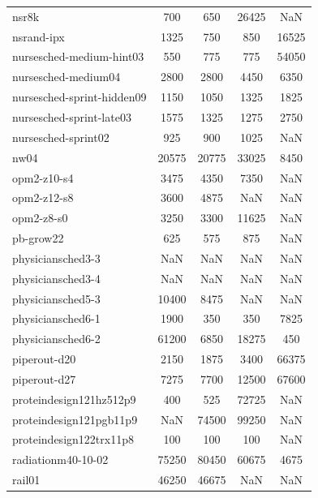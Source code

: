 \begin{longtable}{lcccc}
nsr8k                       &      700 &      650 &    26425 &   NaN \\
nsrand-ipx                  &     1325 &      750 &      850 & 16525 \\
nursesched-medium-hint03    &      550 &      775 &      775 & 54050 \\
nursesched-medium04         &     2800 &     2800 &     4450 &  6350 \\
nursesched-sprint-hidden09  &     1150 &     1050 &     1325 &  1825 \\
nursesched-sprint-late03    &     1575 &     1325 &     1275 &  2750 \\
nursesched-sprint02         &      925 &      900 &     1025 &   NaN \\
nw04                        &    20575 &    20775 &    33025 &  8450 \\
opm2-z10-s4                 &     3475 &     4350 &     7350 &   NaN \\
opm2-z12-s8                 &     3600 &     4875 &      NaN &   NaN \\
opm2-z8-s0                  &     3250 &     3300 &    11625 &   NaN \\
pb-grow22                   &      625 &      575 &      875 &   NaN \\
physiciansched3-3           &      NaN &      NaN &      NaN &   NaN \\
physiciansched3-4           &      NaN &      NaN &      NaN &   NaN \\
physiciansched5-3           &    10400 &     8475 &      NaN &   NaN \\
physiciansched6-1           &     1900 &      350 &      350 &  7825 \\
physiciansched6-2           &    61200 &     6850 &    18275 &   450 \\
piperout-d20                &     2150 &     1875 &     3400 & 66375 \\
piperout-d27                &     7275 &     7700 &    12500 & 67600 \\
proteindesign121hz512p9     &      400 &      525 &    72725 &   NaN \\
proteindesign121pgb11p9     &      NaN &    74500 &    99250 &   NaN \\
proteindesign122trx11p8     &      100 &      100 &      100 &   NaN \\
radiationm40-10-02          &    75250 &    80450 &    60675 &  4675 \\
rail01                      &    46250 &    46675 &      NaN &   NaN \\

\end{longtable}
